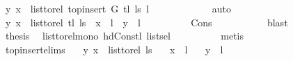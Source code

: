\begin{isabellebody}
\ {\isachardoublequoteopen}{\isacharparenleft}{\kern0pt}y{\isacharcomma}{\kern0pt}\ x{\isacharparenright}{\kern0pt}\ {\isasymin}\ list{\isacharunderscore}{\kern0pt}to{\isacharunderscore}{\kern0pt}rel\ {\isacharparenleft}{\kern0pt}top{\isacharunderscore}{\kern0pt}insert\ G\ {\isacharparenleft}{\kern0pt}tl\ ls{\isacharparenright}{\kern0pt}\ l{\isacharparenright}{\kern0pt}{\isachardoublequoteclose}\isanewline
\ \ \ \ \ \ \ \ \isamarkupfalse%
\ {}\ \isamarkupfalse%
\ auto\isanewline
\ \ \ \ \ \ \isamarkupfalse%
\ \isamarkupfalse%
\ {\isachardoublequoteopen}{\isacharparenleft}{\kern0pt}y{\isacharcomma}{\kern0pt}\ x{\isacharparenright}{\kern0pt}\ {\isasymin}\ list{\isacharunderscore}{\kern0pt}to{\isacharunderscore}{\kern0pt}rel\ {\isacharparenleft}{\kern0pt}tl\ ls{\isacharparenright}{\kern0pt}\ {\isasymor}\ x\ {\isacharequal}{\kern0pt}\ l\ {\isasymor}\ y\ {\isacharequal}{\kern0pt}\ l{\isachardoublequoteclose}\isanewline
\ \ \ \ \ \ \ \ \isamarkupfalse%
\ Cons\ {}\isanewline
\ \ \ \ \ \ \ \ \isamarkupfalse%
\ blast\ \isanewline
\ \ \ \ \ \ \isamarkupfalse%
\ \isamarkupfalse%
\ {\isacharquery}{\kern0pt}thesis\ \isamarkupfalse%
\ list{\isacharunderscore}{\kern0pt}to{\isacharunderscore}{\kern0pt}rel{\isacharunderscore}{\kern0pt}mono{}\ hd{\isacharunderscore}{\kern0pt}Cons{\isacharunderscore}{\kern0pt}tl\ list{\isachardot}{\kern0pt}sel{\isacharparenleft}{\kern0pt}{}{\isacharparenright}{\kern0pt}\isanewline
\ \ \ \ \ \ \ \ \isamarkupfalse%
\ {\isacharparenleft}{\kern0pt}metis{\isacharparenright}{\kern0pt}\ \isanewline
\ \ \ \ \isamarkupfalse%
\ \ \isanewline
\ \ \isamarkupfalse%
\isanewline
{}\isamarkupfalse%
%
\endisatagproof
{\isafoldproof}%
%
\isadelimproof
\isanewline
%
\endisadelimproof
\isanewline
\isanewline
{}\isamarkupfalse%
\ top{\isacharunderscore}{\kern0pt}insert{\isacharunderscore}{\kern0pt}elims{\isacharcolon}{\kern0pt}\isanewline
\ \ \ {\isachardoublequoteopen}{\isacharparenleft}{\kern0pt}y{\isacharcomma}{\kern0pt}\ x{\isacharparenright}{\kern0pt}\ {\isasymnotin}\ list{\isacharunderscore}{\kern0pt}to{\isacharunderscore}{\kern0pt}rel\ ls{\isachardoublequoteclose}\isanewline
\ \ \ {\isachardoublequoteopen}x\ {\isasymnoteq}\ l{\isachardoublequoteclose}\isanewline
\ \ \ {\isachardoublequoteopen}y\ {\isasymnoteq}\ l{\isachardoublequoteclose}\isanewline

\end{isabellebody}
